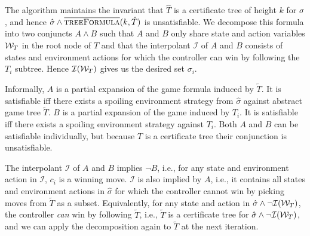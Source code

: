 The algorithm maintains the invariant that $\hat{T}$ is a certificate tree of height $k$ for $\hat{\sigma}$, and hence $\hat{\sigma} \land \textsc{$\overline{\mbox{treeFormula}}$}(k, \hat{T})$ is unsatisfiable.  We decompose this formula into two conjuncts $A \land B$ such that $A$ and $B$ only share state and action variables $\mathcal{W}_T$ in the root node of $T$ and that the interpolant $\mathcal{I}$ of $A$ and $B$ consists of states and environment actions for which the controller can win by following the $T_i$ subtree.  Hence $\mathcal{I}(\mathcal{W}_T)$ gives us the desired set $\sigma_i$.  

Informally, $A$ is a partial expansion of the game formula induced by $\tilde{T}$.  It is satisfiable iff there exists a spoiling environment strategy from $\hat{\sigma}$ against abstract game tree $\tilde{T}$.  $B$ is a partial expansion of the game induced by $T_i$.  It is satisfiable iff there exists a spoiling environment strategy against $T_i$.  Both $A$ and $B$ can be satisfiable individually, but because $T$ is a certificate tree their conjunction is unsatisfiable.

The interpolant $\mathcal{I}$ of $A$ and $B$ implies $\neg B$, i.e., for any state and environment action in $\mathcal{I}$, $c_i$ is a winning move.  $\mathcal{I}$ is also implied by $A$, i.e., it contains all states and environment actions in $\hat{\sigma}$ for which the controller cannot win by picking moves from $\tilde{T}$ as a subset.  Equivalently, for any state and action in $\hat{\sigma} \land \neg \mathcal{I}(\mathcal{W}_T)$, the controller \emph{can} win by following $\tilde{T}$, i.e., $\tilde{T}$ is a certificate tree for $\hat{\sigma} \land \neg \mathcal{I}(\mathcal{W}_T)$, and we can apply the decomposition again to $\tilde{T}$ at the next iteration.


\makeatletter
\newcommand{\pushright}[1]{\ifmeasuring@#1\else\omit\hfill$\displaystyle#1$\fi\ignorespaces}
\makeatother

